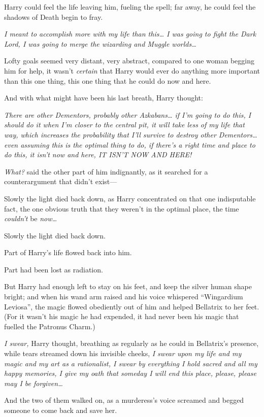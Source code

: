 Harry could feel the life leaving him, fueling the spell; far away, he
could feel the shadows of Death begin to fray.

\emph{I meant to accomplish more with my life than this\ldots{} I was
going to fight the Dark Lord, I was going to merge the wizarding and
Muggle worlds\ldots{}}

Lofty goals seemed very distant, very abstract, compared to one woman
begging him for help, it wasn't \emph{certain} that Harry would ever do
anything more important than this one thing, this one thing that he
could do now and here.

And with what might have been his last breath, Harry thought:

\emph{There are other Dementors, probably other Azkabans\ldots{} if I'm
going to do this, I should do it when I'm closer to the central pit, it
will take less of my life that way, which increases the probability that
I'll survive to destroy other Dementors\ldots{} even assuming this is
the optimal thing to do, if there's a right time and place to do this,
it isn't now and here, IT ISN'T NOW AND HERE!}

\emph{What?} said the other part of him indignantly, as it searched for
a counterargument that didn't exist---

Slowly the light died back down, as Harry concentrated on that one
indisputable fact, the one obvious truth that they weren't in the
optimal place, the time \emph{couldn't} be \emph{now\ldots{}}

Slowly the light died back down.

Part of Harry's life flowed back into him.

Part had been lost as radiation.

But Harry had enough left to stay on his feet, and keep the silver human
shape bright; and when his wand arm raised and his voice whispered
``Wingardium Leviosa'', the magic flowed obediently out of him and
helped Bellatrix to her feet. (For it wasn't his magic he had expended,
it had never been his magic that fuelled the Patronus Charm.)

\emph{I swear,} Harry thought, breathing as regularly as he could in
Bellatrix's presence, while tears streamed down his invisible cheeks,
\emph{I swear upon my life and my magic and my art as a rationalist, I
swear by everything I hold sacred and all my happy memories, I give my
oath that someday I will end this place, please, please may I be
forgiven\ldots{}}

And the two of them walked on, as a murderess's voice screamed and
begged someone to come back and save her.

